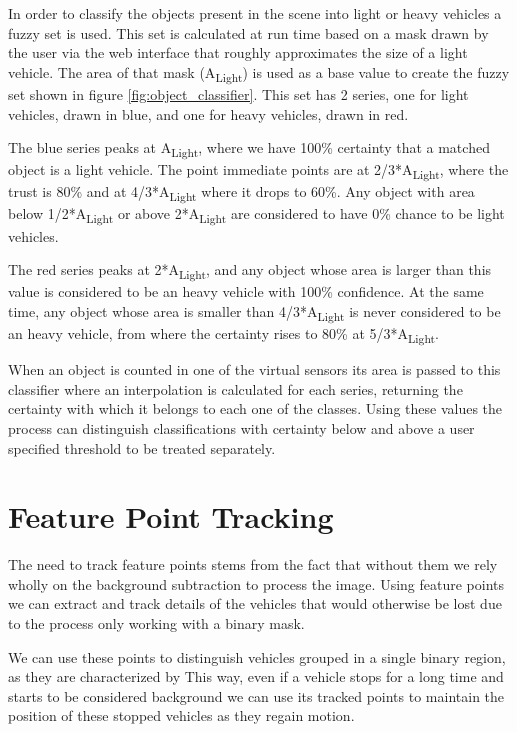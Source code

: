 In order to classify the objects present in the scene into light or heavy vehicles a fuzzy set is used. This set is calculated at run time based on a mask drawn by the user via the web interface that roughly approximates the size of a light vehicle. The area of that mask (A\textsubscript{Light}) is used as a base value to create the fuzzy set shown in figure \ref{fig:object_classifier}. This set has 2 series, one for light vehicles, drawn in blue, and one for heavy vehicles, drawn in red.

The blue series peaks at A\textsubscript{Light}, where we have 100\% certainty that a matched object is a light vehicle. The point immediate points are at 2/3*A\textsubscript{Light}, where the trust is 80\% and at 4/3*A\textsubscript{Light} where it drops to 60\%. Any object with area below 1/2*A\textsubscript{Light} or above 2*A\textsubscript{Light} are considered to have 0\% chance to be light vehicles.

The red series peaks at 2*A\textsubscript{Light}, and any object whose area is larger than this value is considered to be an heavy vehicle with 100\% confidence. At the same time, any object whose area is smaller than 4/3*A\textsubscript{Light} is never considered to be an heavy vehicle, from where the certainty rises to 80\% at 5/3*A\textsubscript{Light}.

When an object is counted in one of the virtual sensors its area is passed to this classifier where an interpolation is calculated for each series, returning the certainty with which it belongs to each one of the classes. Using these values the process can distinguish classifications with certainty below and above a user specified threshold to be treated separately.

\section{Feature Point Tracking}

The need to track feature points stems from the fact that without them we rely wholly on the background subtraction to process the image. Using feature points we can extract and track details of the vehicles that would otherwise be lost due to the process only working with a binary mask. 

We can use these points to distinguish vehicles grouped in a single binary region, as they are characterized by 
This way, even if a vehicle stops for a long time and starts to be considered background we can use its tracked points to maintain the position of these stopped vehicles as they regain motion.

